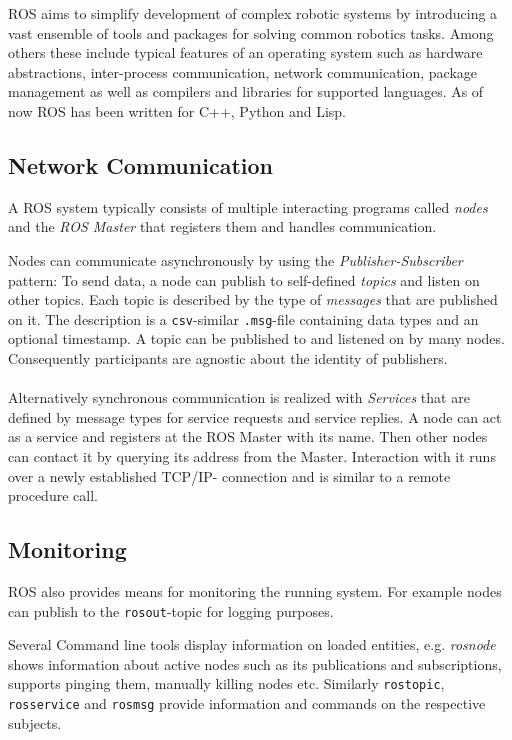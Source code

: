 ROS aims to simplify development of complex robotic systems by introducing a vast ensemble of tools and packages for solving common robotics tasks. Among others these include typical features of an operating system such as hardware abstractions, inter-process communication, network communication, package management as well as compilers and libraries for supported languages. As of now ROS has been written for C++, Python and Lisp.

\subsection{Network Communication}
A ROS system typically consists of multiple interacting programs called \textit{nodes} and the \textit{ROS Master} that registers them and handles communication.

Nodes can communicate asynchronously by using the \textit{Publisher-Subscriber} pattern: To send data, a node can publish to self-defined \textit{topics} and listen on other topics. Each topic is described by the type of \textit{messages} that are published on it. The description is a \texttt{csv}-similar \texttt{.msg}-file containing data types and an optional timestamp.
A topic can be published to and listened on by many nodes. Consequently participants are agnostic about the identity of publishers.
\\\\
Alternatively synchronous communication is realized with \textit{Services} that are defined by message types for service requests and service replies. A node can act as a service and registers at the ROS Master with its name. Then other nodes can contact it by querying its address from the Master. Interaction with it runs over a newly established TCP/IP- connection and is similar to a remote procedure call.

\subsection{Monitoring}
ROS also provides means for monitoring the running system. For example nodes can publish to the \texttt{rosout}-topic for logging purposes.

Several Command line tools display information on loaded entities, e.g. \textit{rosnode} shows information about active nodes such as its publications and subscriptions, supports pinging them, manually killing nodes etc. Similarly \texttt{rostopic}, \texttt{rosservice} and \texttt{rosmsg} provide information and commands on the respective subjects.

